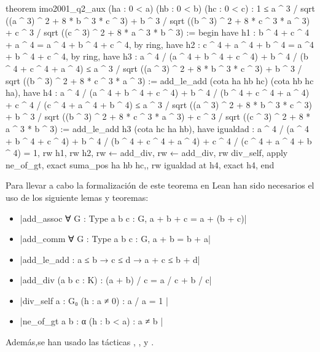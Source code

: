 \begin{leancode}
theorem imo2001_q2_aux
  (ha : 0 < a)
  (hb : 0 < b)
  (hc : 0 < c)
  : 1 ≤ a ^ 3 / sqrt ((a ^ 3) ^ 2 + 8 * b ^ 3 * c ^ 3) +
        b ^ 3 / sqrt ((b ^ 3) ^ 2 + 8 * c ^ 3 * a ^ 3) +
        c ^ 3 / sqrt ((c ^ 3) ^ 2 + 8 * a ^ 3 * b ^ 3) :=
begin
  have h1 : b ^ 4 + c ^ 4 + a ^ 4 = a ^ 4 + b ^ 4 + c ^ 4,
    by ring,
  have h2 : c ^ 4 + a ^ 4 + b ^ 4 = a ^4 + b ^ 4 + c ^ 4,
    by ring,
  have h3 : a ^ 4 / (a ^ 4 + b ^ 4 + c ^ 4) +
            b ^ 4 / (b ^ 4 + c ^ 4 + a ^ 4) ≤
            a ^ 3 / sqrt ((a ^ 3) ^ 2 + 8 * b ^ 3 * c ^ 3) +
            b ^ 3 / sqrt ((b ^ 3) ^ 2 + 8 * c ^ 3 * a ^ 3) :=
    add_le_add (cota ha hb hc) (cota hb hc ha),
  have h4 : a ^ 4 / (a ^ 4 + b ^ 4 + c ^ 4) +
            b ^ 4 / (b ^ 4 + c ^ 4 + a ^ 4) +
            c ^ 4 / (c ^ 4 + a ^ 4 + b ^ 4) ≤
            a ^ 3 / sqrt ((a ^ 3) ^ 2 + 8 * b ^ 3 * c ^ 3) +
            b ^ 3 / sqrt ((b ^ 3) ^ 2 + 8 * c ^ 3 * a ^ 3) +
            c ^ 3 / sqrt ((c ^ 3) ^ 2 + 8 * a ^ 3 * b ^ 3) :=
    add_le_add h3 (cota hc ha hb),
  have igualdad : a ^ 4 / (a ^ 4 + b ^ 4 + c ^ 4) +
                  b ^ 4 / (b ^ 4 + c ^ 4 + a ^ 4) +
                  c ^ 4 / (c ^ 4 + a ^ 4 + b ^ 4) = 1,
    { rw h1,
      rw h2,
      rw ← add_div,
      rw ← add_div,
      rw div_self,
      apply ne_of_gt,
      exact suma_pos ha hb hc,},
  rw igualdad at h4,
  exact h4,
end
\end{leancode}

Para llevar a cabo la formalización de este teorema en Lean han sido
necesarios el uso de los siguiente lemas y teoremas:
\begin{itemize}
\item {}|add_assoc ∀ {G : Type} {a b c : G}, a + b + c = a + (b + c)|
\item {}|add_comm ∀ {G : Type} {a b c : G}, a + b  = b + a|
\item {}|add_le_add : a ≤ b → c ≤ d → a + c ≤ b + d|
\item {}|add_div (a b c : K) : (a + b) / c = a / c + b / c|
\item {}|div_self {a : G₀} (h : a ≠ 0) : a / a = 1 |
\item {}|ne_of_gt {a b : α} (h : b < a) : a ≠ b |
\end{itemize}

Además,se han usado las tácticas
,
,
 y
.

